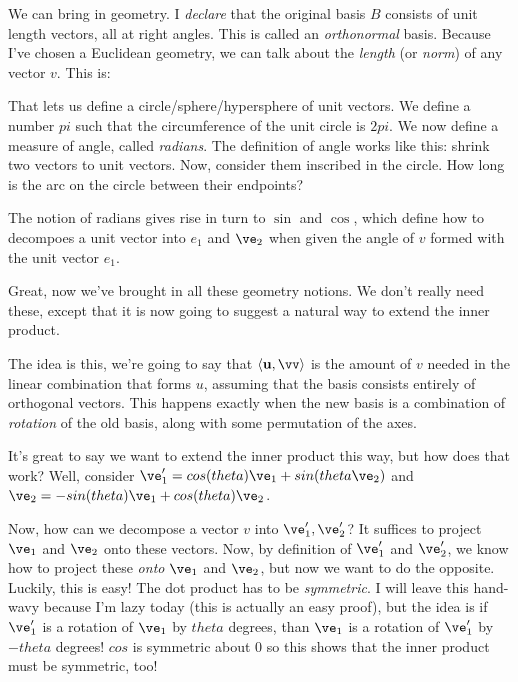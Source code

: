 We can bring in geometry. I \emph{declare} that the original basis $B$
consists of unit length vectors, all at right angles. This is called an
\emph{orthonormal} basis. Because I've chosen a Euclidean geometry, we
can talk about the \emph{length} (or \emph{norm}) of any vector $v$.
This is:

\begin{nedqn}
\end{nedqn}

That lets us define a circle/sphere/hypersphere of unit vectors. We
define a number $pi$ such that the circumference of the unit circle is
$2pi$. We now define a measure of angle, called \emph{radians}. The
definition of angle works like this: shrink two vectors to unit vectors.
Now, consider them inscribed in the circle. How long is the arc on the
circle between their endpoints?

The notion of radians gives rise in turn to $\sin$ and $\cos$, which
define how to decompoes a unit vector into $e_1$ and $\ve_2$ when given
the angle of $v$ formed with the unit vector $e_1$.

Great, now we've brought in all these geometry notions. We don't
really need these, except that it is now going to suggest a natural
way to extend the inner product.

The idea is this, we're going to say that $\iprod{\vu}{\vv}$ is the
amount of $v$ needed in the linear combination that forms $u$, assuming
that the basis consists entirely of orthogonal vectors. This happens
exactly when the new basis is a combination of \emph{rotation} of the
old basis, along with some permutation of the axes.

It's great to say we want to extend the inner product this way, but how
does that work? Well, consider $\ve_1' = cos(theta) \ve_1 + sin(theta
\ve_2)$ and $\ve_2 = -sin(theta) \ve_1 + cos(theta)\ve_2$.

Now, how can we decompose a vector $v$ into $\ve_1', \ve_2'$? It
suffices to project $\ve_1$ and $\ve_2$ onto these vectors. Now, by
definition of $\ve_1'$ and $\ve_2'$, we know how to project these
\emph{onto} $\ve_1$ and $\ve_2$, but now we want to do the opposite.
Luckily, this is easy! The dot product has to be \emph{symmetric}. I
will leave this hand-wavy because I'm lazy today (this is actually an
easy proof), but the idea is if $\ve_1'$ is a rotation of $\ve_1$ by
$theta$ degrees, than $\ve_1$ is a rotation of $\ve_1'$ by $-theta$
degrees! $cos$ is symmetric about $0$ so this shows that the inner
product must be symmetric, too!


